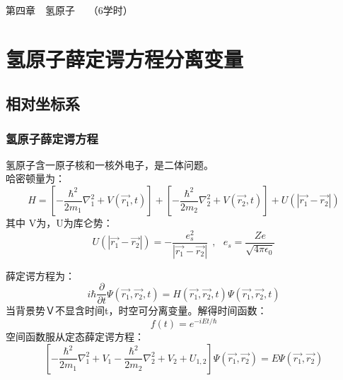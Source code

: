 \begin{frame}
		\frametitle{}
	    \begin{center}
		{ {\Huge 第四章~~氢原子~~  （6学时）}}
	    \end{center}    
\end{frame}

\section{氢原子薛定谔方程分离变量 }

\subsection{相对坐标系}

\begin{frame}
	\frametitle{氢原子薛定谔方程}
	氢原子含一原子核和一核外电子，是二体问题。\\
	哈密顿量为：
	\begin{equation*}
		H=\left[-\frac{\hbar^2}{2 m_1} \nabla_1 ^2 + V(\vec{r_1},t) \right]  + \left[-\frac{\hbar^2}{2 m_2} \nabla_2 ^2 + V(\vec{r_2},t) \right]  +U(| \vec{r_1}-\vec{r_2} | )
	\end{equation*}
	其中 V为，U为库仑势：
	\begin{equation*}
		U(| \vec{r_1}-\vec{r_2} | )=-\frac{e_s ^2}{| \vec{r_1}-\vec{r_2} |} ~~,~~~ e_s =\frac{Ze}{\sqrt{4\pi\epsilon_0}}
	\end{equation*}
\end{frame}

\begin{frame}
	薛定谔方程为：
	\begin{equation*}
		i\hbar \frac{\partial }{\partial t} \Psi (\vec{r_1},\vec{r_2},t ) =H (\vec{r_1},\vec{r_2}, t  )  \Psi (\vec{r_1},\vec{r_2},t ) 
	\end{equation*}
	当背景势Ｖ不显含时间t，时空可分离变量。解得时间函数：
	\begin{equation*}
		f(t) =e^{-iEt/\hbar}
	\end{equation*}
	空间函数服从定态薛定谔方程：
	\begin{equation*}
		\left[-\frac{\hbar^2}{2 m_1} \nabla_1 ^2 + V_1  -\frac{\hbar^2}{2 m_2} \nabla_2 ^2 + V_2  +U_{1,2} \right] \Psi (\vec{r_1},\vec{r_2}) =E \Psi (\vec{r_1},\vec{r_2}) 
	\end{equation*}
\end{frame}		

